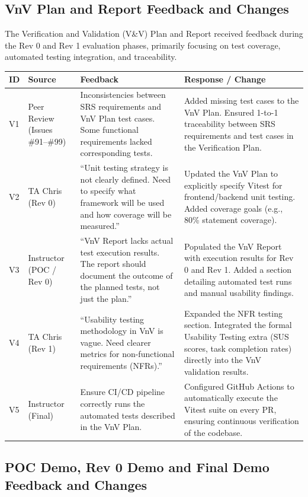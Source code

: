 \documentclass{article}
\begin{document}
\subsection{VnV Plan and Report Feedback and Changes}

The Verification and Validation (V\&V) Plan and Report received feedback during the Rev 0 and Rev 1 evaluation phases, primarily focusing on test coverage, automated testing integration, and traceability.

\begin{longtable}{p{} p{} p{} p{}}
\toprule
\textbf{ID} & \textbf{Source} & \textbf{Feedback} & \textbf{Response / Change} \\
\midrule
\endhead
\bottomrule
\endfoot

V1 & Peer Review (Issues \#91--\#99) & Inconsistencies between SRS requirements and VnV Plan test cases. Some functional requirements lacked corresponding tests. & Added missing test cases to the VnV Plan. Ensured 1-to-1 traceability between SRS requirements and test cases in the Verification Plan. \\
\midrule

V2 & TA Chris (Rev 0) & ``Unit testing strategy is not clearly defined. Need to specify what framework will be used and how coverage will be measured.'' & Updated the VnV Plan to explicitly specify Vitest for frontend/backend unit testing. Added coverage goals (e.g., 80\% statement coverage). \\
\midrule

V3 & Instructor (POC / Rev 0) & ``VnV Report lacks actual test execution results. The report should document the outcome of the planned tests, not just the plan.'' & Populated the VnV Report with execution results for Rev 0 and Rev 1. Added a section detailing automated test runs and manual usability findings. \\
\midrule

V4 & TA Chris (Rev 1) & ``Usability testing methodology in VnV is vague. Need clearer metrics for non-functional requirements (NFRs).'' & Expanded the NFR testing section. Integrated the formal Usability Testing extra (SUS scores, task completion rates) directly into the VnV validation results. \\
\midrule

V5 & Instructor (Final) & Ensure CI/CD pipeline correctly runs the automated tests described in the VnV Plan. & Configured GitHub Actions to automatically execute the Vitest suite on every PR, ensuring continuous verification of the codebase. \\

\end{longtable}\subsection{POC Demo, Rev 0 Demo and Final Demo Feedback and Changes}
\end{document}
